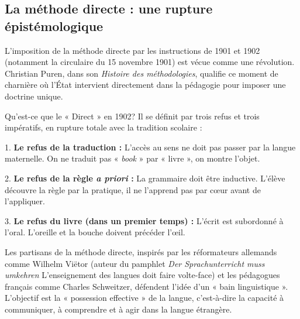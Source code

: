 \subsection{La méthode directe : une rupture épistémologique}

L'imposition de la méthode directe par les instructions de 1901 et 1902 (notamment la circulaire du
15 novembre 1901) est vécue comme une révolution. Christian Puren, dans son \textit{Histoire des
méthodologies}, qualifie ce moment de charnière où l'État intervient directement dans la pédagogie
pour imposer une doctrine unique.\cite{I-2-2-ref2}

Qu'est-ce que le « Direct » en 1902? Il se définit par trois refus et trois impératifs, en rupture
totale avec la tradition scolaire :

1. \textbf{Le refus de la traduction :} L'accès au sens ne doit pas passer par la langue maternelle.
On ne traduit pas « \textit{book} » par « livre », on montre l'objet.

2. \textbf{Le refus de la règle \textit{a priori} :} La grammaire doit être inductive. L'élève
découvre la règle par la pratique, il ne l'apprend pas par cœur avant de l'appliquer.

3. \textbf{Le refus du livre (dans un premier temps) :} L'écrit est subordonné à l'oral. L'oreille
et la bouche doivent précéder l'œil.

Les partisans de la méthode directe, inspirés par les réformateurs allemands comme Wilhelm Viëtor
(auteur du pamphlet \textit{Der Sprachunterricht muss umkehren\!} \- \og L'enseignement des langues
doit faire volte-face\!\fg{}) et les pédagogues français comme Charles Schweitzer, défendent l'idée
d'un « bain linguistique ».\cite{I-2-2-ref3} L'objectif est la « possession effective » de la
langue, c'est-à-dire la capacité à communiquer, à comprendre et à agir dans la langue
étrangère.\cite{I-2-2-ref1}

